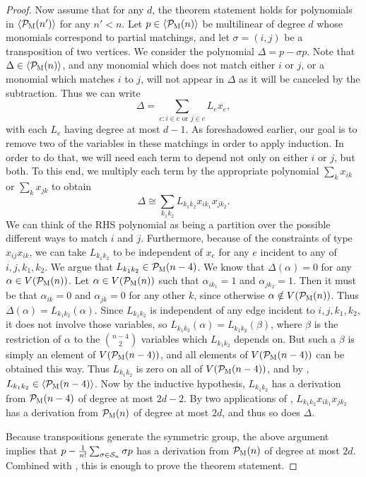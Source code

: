 \begin{proof}
Now assume that for any $d$, the theorem statement holds for polynomials in $\langle \mathcal P_{\textsc{M}}(n') \rangle$ for any $n' < n$. 
Let $p \in \langle \mathcal P_{\textsc{M}}(n) \rangle$ be multilinear of degree $d$ whose monomials correspond to partial matchings, and let $\sigma = (i,j)$ be a transposition of two vertices.
We consider the polynomial $\Delta = p - \sigma p$. Note that $\Delta \in \langle \mathcal P_{\textsc{M}}(n) \rangle$, and any monomial which does not match either $i$ or $j$, or a monomial which matches $i$ to $j$, will not appear in $\Delta$ as it will be canceled by the subtraction.
Thus we can write
\[\Delta = \sum_{e: i \in e \text{ or } j \in e} L_e x_e,\]
with each $L_e$ having degree at most $d-1$. As foreshadowed earlier, our goal is to remove two of the variables in these matchings in order to apply induction. In order to do that, we will need each term to depend not only on either $i$ or $j$, but both. To this end, we multiply each term by the appropriate polynomial $\sum_k x_{ik}$ or $\sum_k x_{jk}$ to obtain
\[\Delta \cong \sum_{k_1k_2} L_{k_1k_2} x_{ik_1}x_{jk_2}.\]
We can think of the RHS polynomial as being a partition over the possible different ways to match $i$ and $j$.
Furthermore, because of the constraints of type $x_{ij}x_{ik}$, we can take $L_{k_1k_2}$ to be independent of $x_e$ for any $e$ incident to any of $i,j,k_1,k_2$. 
We argue that $L_{k_1k_2} \in \mathcal P_{\textsc{M}}(n-4)$. We know that $\Delta(\alpha) = 0$ for any $\alpha \in V(\mathcal P_{\textsc{M}}(n))$. Let $\alpha \in V(\mathcal P_{\textsc{M}}(n))$ such that $\alpha_{ik_1} = 1$ and $\alpha_{jk_2} = 1$. 
Then it must be that $\alpha_{ik} = 0$ and $\alpha_{jk} = 0$ for any other $k$, since otherwise $\alpha \notin V(\mathcal P_{\textsc{M}}(n))$.
Thus $\Delta(\alpha) = L_{k_1k_2}(\alpha)$. Since $L_{k_1k_2}$ is independent of any edge incident to $i,j,k_1,k_2$, it does not involve those variables, so $L_{k_1k_2}(\alpha) = L_{k_1k_2}(\beta)$, where $\beta$ is the restriction of $\alpha$ to the $\binom{n-4}{2}$ variables which $L_{k_1k_2}$ depends on. But such a $\beta$ is simply an element of $V(\mathcal P_{\textsc{M}}(n-4))$, and all elements of $V(\mathcal P_{\textsc{M}}(n-4))$ can be obtained this way. Thus $L_{k_1k_2}$ is zero on all of $V(\mathcal P_{\textsc{M}}(n-4))$, and by , $L_{k_1k_2} \in \langle \mathcal P_{\textsc{M}}(n-4) \rangle$. Now by the inductive hypothesis, $L_{k_1k_2}$ has a derivation from $\mathcal P_{\textsc{M}}(n-4)$ of degree at most $2d-2$. By two applications of , $L_{k_1k_2}x_{ik_1}x_{jk_2}$ has a derivation from $\mathcal P_{\textsc{M}}(n)$ of degree at most $2d$, and thus so does $\Delta$.

Because transpositions generate the symmetric group, the above argument implies that $p - \frac{1}{n!}\sum_{\sigma \in \mathcal S_n} \sigma p$ has a derivation from $\mathcal P_{\textsc{M}}(n)$ of degree at most $2d$. Combined with , this is enough to prove the theorem statement. 
\end{proof}

